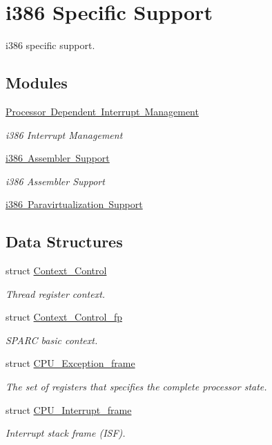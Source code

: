 \hypertarget{group__RTEMSScoreCPUi386}{}\section{i386 Specific Support}
\label{group__RTEMSScoreCPUi386}


i386 specific support.  


\subsection*{Modules}
\begin{DoxyCompactItemize}
\item 
\mbox{\hyperlink{group__RTEMSScoreCPUi386Interrupt}{Processor Dependent Interrupt Management}}
\begin{DoxyCompactList}\small\item\em i386 Interrupt Management \end{DoxyCompactList}\item 
\mbox{\hyperlink{group__RTEMSScoreCPUi386ASM}{i386 Assembler Support}}
\begin{DoxyCompactList}\small\item\em i386 Assembler Support \end{DoxyCompactList}\item 
\mbox{\hyperlink{group__RTEMSScoreCPUi386Paravirt}{i386 Paravirtualization Support}}
\end{DoxyCompactItemize}
\subsection*{Data Structures}
\begin{DoxyCompactItemize}
\item 
struct \mbox{\hyperlink{structContext__Control}{Context\+\_\+\+Control}}
\begin{DoxyCompactList}\small\item\em Thread register context. \end{DoxyCompactList}\item 
struct \mbox{\hyperlink{structContext__Control__fp}{Context\+\_\+\+Control\+\_\+fp}}
\begin{DoxyCompactList}\small\item\em S\+P\+A\+RC basic context. \end{DoxyCompactList}\item 
struct \mbox{\hyperlink{structCPU__Exception__frame}{C\+P\+U\+\_\+\+Exception\+\_\+frame}}
\begin{DoxyCompactList}\small\item\em The set of registers that specifies the complete processor state. \end{DoxyCompactList}\item 
struct \mbox{\hyperlink{structCPU__Interrupt__frame}{C\+P\+U\+\_\+\+Interrupt\+\_\+frame}}
\begin{DoxyCompactList}\small\item\em Interrupt stack frame (I\+SF). \end{DoxyCompactList}\end{DoxyCompactItemize}
